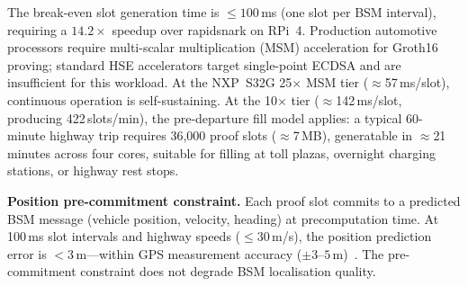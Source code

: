 \begin{table}[t]
\centering
\caption{Hardware Tier Analysis: Proof Cache Production Rate vs.\ Self-Sustaining
Threshold ($\geq$600\,slots/min)}
\label{tab:hardware_tiers}
\end{table}

The break-even slot generation time is $\leq 100$\,ms (one slot per BSM interval),
requiring a $\mathbf{14.2\times}$ speedup over rapidsnark on RPi~4.
Production automotive processors require multi-scalar multiplication (MSM)
acceleration for Groth16 proving; standard HSE accelerators target single-point
ECDSA and are insufficient for this workload. At the NXP~S32G 25$\times$ MSM tier
($\approx$57\,ms/slot), continuous operation is self-sustaining. At the 10$\times$
tier ($\approx$142\,ms/slot, producing 422\,slots/min), the pre-departure fill
model applies: a typical 60-minute highway trip requires 36{,}000 proof slots
($\approx$7\,MB), generatable in $\approx$21\,minutes across four cores, suitable
for filling at toll plazas, overnight charging stations, or highway rest stops.

\textbf{Position pre-commitment constraint.}
Each proof slot commits to a predicted BSM message (vehicle position, velocity,
heading) at precomputation time. At 100\,ms slot intervals and highway speeds
($\leq 30$\,m/s), the position prediction error is $<3$\,m---within GPS measurement
accuracy ($\pm 3$--$5$\,m)~\cite{gps_accuracy}. The pre-commitment constraint does
not degrade BSM localisation quality.

